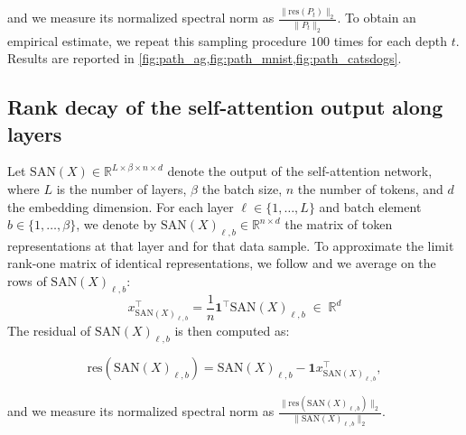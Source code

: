 \documentclass{article}
\theoremstyle{definition}
\theoremstyle{plain}
\begin{document}
and we measure its normalized spectral norm as $\frac{\|\mathrm{res}(P_t)\|_2}{\|P_t\|_2}$. To obtain an empirical estimate, we repeat this sampling procedure $100$ times for each depth $t$. Results are reported in \cref{fig:path_ag,fig:path_mnist,fig:path_catsdogs}.

\subsection{Rank decay of the self-attention output along layers}
\label{san_residual}

Let $\mathrm{SAN}(X) \in \mathbb{R}^{L \times \beta \times n \times d}$ denote the output of the self-attention network, where $L$ is the number of layers,  $\beta$ the batch size, $n$ the number of tokens, and $d$ the embedding dimension.
For each layer $\ell \in \{1,\dots,L\}$ and batch element $b \in \{1,\dots,\beta\}$, we denote by $\mathrm{SAN}(X)_{\ell,b} \in \mathbb{R}^{n \times d}$
the matrix of token representations at that layer and for that data sample.
To approximate the limit rank-one matrix of identical representations, we follow \cite{dong2021attention} and we average on the rows of $\mathrm{SAN}(X)_{\ell,b}$:
\[
x^\top_{\mathrm{SAN}(X)_{\ell,b}} = \frac{1}{n} \mathbf{1}^\top \mathrm{SAN}(X)_{\ell,b} \;\in\;\mathbb{R}^{d}
\]
The residual of $\mathrm{SAN}(X)_{\ell,b}$ is then computed as:

\begin{equation}\label{equ:res_san}
\mathrm{res}(\mathrm{SAN}(X)_{\ell,b}) = \mathrm{SAN}(X)_{\ell,b} - \mathbf{1} x^\top_{\mathrm{SAN}(X)_{\ell,b}},
\end{equation}

and we measure its normalized spectral norm as $\frac{\|\mathrm{res}(\mathrm{SAN}(X)_{\ell,b})\|_2}{\|\mathrm{SAN}(X)_{\ell,b}\|_2}$.
\end{document}
